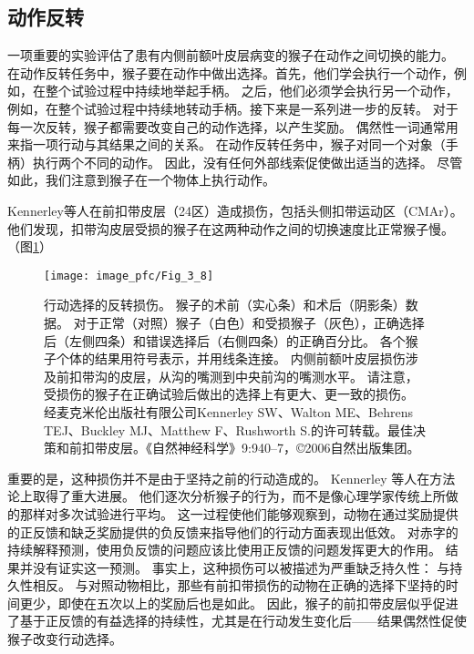 \subsection{动作反转}

一项重要的实验评估了患有内侧前额叶皮层病变的猴子在动作之间切换的能力\cite{kennerley2006optimal}。
在动作反转任务中，猴子要在动作中做出选择。首先，他们学会执行一个动作，例如，在整个试验过程中持续地举起手柄。
之后，他们必须学会执行另一个动作，例如，在整个试验过程中持续地转动手柄。接下来是一系列进一步的反转。
对于每一次反转，猴子都需要改变自己的动作选择，以产生奖励。
偶然性一词通常用来指一项行动与其结果之间的关系。
在动作反转任务中，猴子对同一个对象（手柄）执行两个不同的动作。
因此，没有任何外部线索促使做出适当的选择。
尽管如此，我们注意到猴子在一个物体上执行动作。\par
Kennerley等人在前扣带皮层（24区）造成损伤，包括头侧扣带运动区（CMAr）。
他们发现，扣带沟皮层受损的猴子在这两种动作之间的切换速度比正常猴子慢。（图\ref{fig:3_8}）\par


\begin{figure}[!htb]
	\centering
 	\texttt{[image: image\_pfc/Fig\_3\_8]}
	\caption{行动选择的反转损伤。
		猴子的术前（实心条）和术后（阴影条）数据。
		对于正常（对照）猴子（白色）和受损猴子（灰色），正确选择后（左侧四条）和错误选择后（右侧四条）的正确百分比。
		各个猴子个体的结果用符号表示，并用线条连接。
		内侧前额叶皮层损伤涉及前扣带沟的皮层，从沟的嘴测到中央前沟的嘴测水平。
		请注意，受损伤的猴子在正确试验后做出的选择上有更大、更一致的损伤。
		经麦克米伦出版社有限公司Kennerley SW、Walton ME、Behrens TEJ、Buckley MJ、Matthew F、Rushworth S.的许可转载。最佳决策和前扣带皮层。《自然神经科学》9:940–7，©2006自然出版集团。}
	\label{fig:3_8}
\end{figure}


重要的是，这种损伤并不是由于坚持之前的行动造成的。
Kennerley 等人在方法论上取得了重大进展。 他们逐次分析猴子的行为，而不是像心理学家传统上所做的那样对多次试验进行平均。
这一过程使他们能够观察到，动物在通过奖励提供的正反馈和缺乏奖励提供的负反馈来指导他们的行动方面表现出低效。
对赤字的持续解释预测，使用负反馈的问题应该比使用正反馈的问题发挥更大的作用。
结果并没有证实这一预测。
事实上，这种损伤可以被描述为严重缺乏持久性：
与持久性相反。
与对照动物相比，那些有前扣带损伤的动物在正确的选择下坚持的时间更少，即使在五次以上的奖励后也是如此。
因此，猴子的前扣带皮层似乎促进了基于正反馈的有益选择的持续性，尤其是在行动发生变化后——结果偶然性促使猴子改变行动选择。\par


